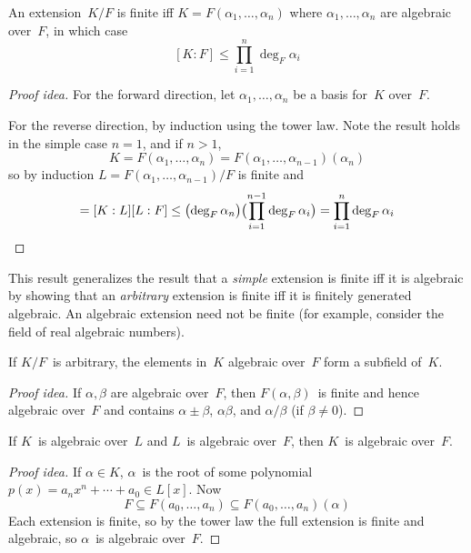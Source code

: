 \begin{thm}
An extension~\(K/F\) is finite iff \(K=F(\alpha_1,\ldots,\alpha_n)\) where \(\alpha_1,\ldots,\alpha_n\) are algebraic over~\(F\), in which case
\[[K:F]\le\prod_{i=1}^n\deg_F\alpha_i\]
\end{thm}
\begin{proof}[Proof idea]
For the forward direction, let \(\alpha_1,\ldots,\alpha_n\) be a basis for~\(K\) over~\(F\).

For the reverse direction, by induction using the tower law. Note the result holds in the simple case \(n=1\), and if \(n>1\),
\[K=F(\alpha_1,\ldots,\alpha_n)=F(\alpha_1,\ldots,\alpha_{n-1})(\alpha_n)\]
so by induction \(L=F(\alpha_1,\ldots,\alpha_{n-1})/F\) is finite and
\begin{equation*}
[K:F]=[K:L][L:F]\le\bigl(\deg_F\alpha_n\bigr)\bigl(\prod_{i=1}^{n-1}\deg_F\alpha_i\bigr)=\prod_{i=1}^n\deg_F\alpha_i\qedhere
\end{equation*}
\end{proof}
\begin{rmk}
This result generalizes the result that a \emph{simple} extension is finite iff it is algebraic by showing that an \emph{arbitrary} extension is finite iff it is finitely generated algebraic. An algebraic extension need not be finite (for example, consider the field of real algebraic numbers).
\end{rmk}
\begin{cor}
If \(K/F\)~is arbitrary, the elements in~\(K\) algebraic over~\(F\) form a subfield of~\(K\).
\end{cor}
\begin{proof}[Proof idea]
If \(\alpha,\beta\) are algebraic over~\(F\), then \(F(\alpha,\beta)\)~is finite and hence algebraic over~\(F\) and contains \(\alpha\pm\beta\), \(\alpha\beta\), and \(\alpha/\beta\) (if \(\beta\ne0\)).
\end{proof}
\begin{cor}
If \(K\)~is algebraic over~\(L\) and \(L\)~is algebraic over~\(F\), then \(K\)~is algebraic over~\(F\).
\end{cor}
\begin{proof}[Proof idea]
If \(\alpha\in K\), \(\alpha\)~is the root of some polynomial \(p(x)=a_nx^n+\cdots+a_0\in L[x]\). Now
\[F\subseteq F(a_0,\ldots,a_n)\subseteq F(a_0,\ldots,a_n)(\alpha)\]
Each extension is finite, so by the tower law the full extension is finite and algebraic, so \(\alpha\)~is algebraic over~\(F\).
\end{proof}

